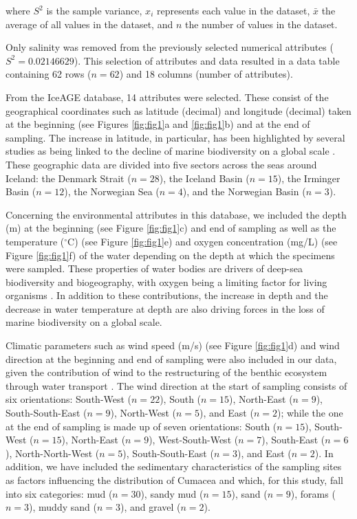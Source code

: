 where $S^2$ is the sample variance, $x_i$ represents each value in the dataset, $\bar{x}$ the average of all values in the dataset, and $n$ the number of values in the dataset.

Only salinity was removed from the previously selected numerical attributes ($S^2 = 0.02146629$). This selection of attributes and data resulted in a data table containing 62 rows ($n=62$) and 18 columns (number of attributes). 

From the IceAGE database, 14 attributes were selected. These consist of the geographical coordinates such as latitude (decimal) and longitude (decimal) taken at the beginning (see Figures \ref{fig:fig1}a and \ref{fig:fig1}b) and at the end of sampling. The increase in latitude, in particular, has been highlighted by several studies as being linked to the decline of marine biodiversity on a global scale \citep{lambshead_latitudinal_2000, gage_diversity_2004}. These geographic data are divided into five sectors across the seas around Iceland: the Denmark Strait ($n=28$), the Iceland Basin ($n=15$), the Irminger Basin ($n=12$), the Norwegian Sea ($n=4$), and the Norwegian Basin ($n=3$). 

Concerning the environmental attributes in this database, we included the depth (m) at the beginning (see Figure \ref{fig:fig1}c) and end of sampling as well as the temperature ($^\circ$C) (see Figure \ref{fig:fig1}e) and oxygen concentration (mg/L) (see Figure \ref{fig:fig1}f) of the water depending on the depth at which the specimens were sampled. These properties of water bodies are drivers of deep-sea biodiversity and biogeography, with oxygen being a limiting factor for living organisms \citep{keeling_ocean_2010}. In addition to these contributions, the increase in depth \citep{rex_global_2006,costello_marine_2017} and the decrease in water temperature at depth \citep{lambshead_latitudinal_2000} are also driving forces in the loss of marine biodiversity on a global scale.

Climatic parameters such as wind speed (m/s) (see Figure \ref{fig:fig1}d) and wind direction at the beginning and end of sampling were also included in our data, given the contribution of wind to the restructuring of the benthic ecosystem through water transport \citep{waga_recent_2020,saeedi_environmental_2022}. The wind direction at the start of sampling consists of six orientations: South-West ($n=22$), South ($n=15$), North-East ($n=9$), South-South-East ($n=9$), North-West ($n=5$), and East ($n=2$); while the one at the end of sampling is made up of seven orientations: South ($n=15$), South-West ($n=15$), North-East ($n=9$), West-South-West ($n=7$), South-East ($n=6$), North-North-West ($n=5$), South-South-East ($n=3$), and East ($n=2$). In addition, we have included the sedimentary characteristics of the sampling sites as factors influencing the distribution of Cumacea \citep{uhlir_adding_2021} and which, for this study, fall into six categories: mud ($n=30$), sandy mud ($n=15$), sand ($n=9$), forams ($n=3$), muddy sand ($n=3$), and gravel ($n=2$).

